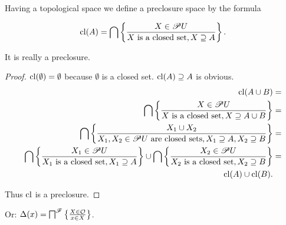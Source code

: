 Having a topological space we define a preclosure space by the formula

\[
\operatorname{cl}(A)=\bigcap\left\{ \frac{X\in\mathscr{P} U}{X\text{ is a closed set},X\supseteq A}\right\}.
\]

\begin{prop}
It is really a preclosure.\end{prop}
\begin{proof}
$\operatorname{cl}(\emptyset)=\emptyset$ because $\emptyset$ is a closed set.
$\operatorname{cl}(A)\supseteq A$ is obvious.
\begin{align*}
\operatorname{cl}(A\cup B) & =\\
\bigcap\left\{ \frac{X\in\mathscr{P} U}{X\text{ is a closed set},X\supseteq A\cup B}\right\} & =\\
\bigcap\left\{ \frac{X_{1}\cup X_{2}}{X_{1},X_{2}\in\mathscr{P} U\text{ are closed sets},X_{1}\supseteq A,X_{2}\supseteq B}\right\} & =\\
\bigcap\left\{ \frac{X_{1}\in\mathscr{P} U}{X_{1}\text{ is a closed set},X_{1}\supseteq A}\right\}\cup\bigcap\left\{ \frac{X_{2}\in\mathscr{P} U}{X_{2}\text{ is a closed set},X_{2}\supseteq B}\right\} & =\\
\operatorname{cl}(A)\cup\operatorname{cl}(B).
\end{align*}


Thus $\operatorname{cl}$ is a preclosure.
\end{proof}
Or: $\Delta(x)=\bigsqcap^{\mathscr{F}}\left\{ \frac{X\in\mathcal{O}}{x\in X}\right\}$.

